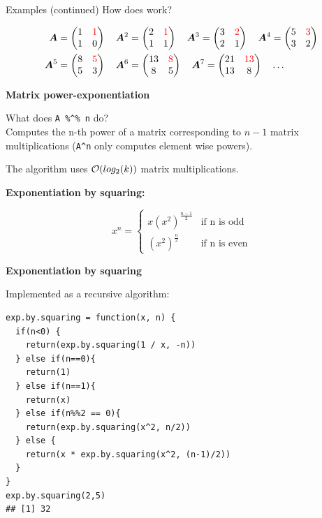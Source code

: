 \documentclass[11pt,compress,t,notes=noshow, xcolor=table]{beamer}
\begin{document}
\begin{vbframe}{Examples (continued)}
How does  work?

\begin{align*}
  \bm{A} &= \begin{pmatrix} 1 & \color{red}{1} \\ 1 & 0 \end{pmatrix} \quad
  \bm{A}^2 = \begin{pmatrix} 2 & \color{red}{1} \\ 1 & 1 \end{pmatrix} \quad
  \bm{A}^3 = \begin{pmatrix} 3 & \color{red}{2} \\ 2 & 1 \end{pmatrix} \quad
  \bm{A}^4 = \begin{pmatrix} 5 & \color{red}{3} \\ 3 & 2 \end{pmatrix} \\
  \bm{A}^5 &= \begin{pmatrix} 8 & \color{red}{5} \\ 5 & 3 \end{pmatrix} \quad
  \bm{A}^6 = \begin{pmatrix} 13 & \color{red}{8} \\ 8 & 5 \end{pmatrix} \quad
  \bm{A}^7 = \begin{pmatrix} 21 & \color{red}{13} \\ 13 & 8 \end{pmatrix} \quad
  \hdots
\end{align*}

\framebreak


\textbf{Matrix power-exponentiation}

What does \verb|A %^% n| do? \\
Computes the n-th power of a matrix corresponding to $n-1$ matrix multiplications
(\verb|A^n| only computes element wise powers).

The algorithm uses $\mathcal{O}(log_2(k))$ matrix multiplications.

\lz
\textbf{Exponentiation by squaring:}

$$
  x^n =
  \begin{cases}
    x(x^2)^{\frac{n-1}{2}} & \text{if n is odd} \\
    (x^2)^{\frac{n}{2}}    & \text{if n is even}
  \end{cases}
$$

\framebreak

\textbf{Exponentiation by squaring}

Implemented as a recursive algorithm:

\begin{scriptsize}
\begin{verbatim}
exp.by.squaring = function(x, n) {
  if(n<0) {
    return(exp.by.squaring(1 / x, -n))
  } else if(n==0){
    return(1)
  } else if(n==1){
    return(x)
  } else if(n%%2 == 0){
    return(exp.by.squaring(x^2, n/2))
  } else {
    return(x * exp.by.squaring(x^2, (n-1)/2))
  }
}
exp.by.squaring(2,5)
## [1] 32
\end{verbatim}
\end{scriptsize}

\framebreak


\end{vbframe}
\end{document}
